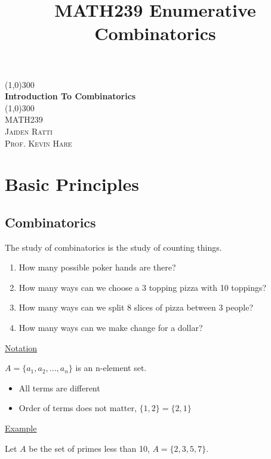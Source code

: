 \documentclass{article}
\title{MATH239 Enumerative Combinatorics}
\begin{document}
\begin{titlepage}
	\begin{center}
    \line(1,0){300}\\
    [0.65cm]
	\huge{\bfseries Introduction To Combinatorics}\\
	\line(1,0){300}\\
	\textsc{\Large MATH239}\\
	\textsc{\Large  Jaiden Ratti}\\
        \textsc{\Large Prof. Kevin Hare}\\
	[5.5cm]
	\end{center}
\end{titlepage}




\tableofcontents

\pagebreak

\section{Basic Principles}

\subsection{Combinatorics}

The study of combinatorics is the study of counting things. 

\begin{enumerate}
    \item How many possible poker hands are there?
    \item How many ways can we choose a 3 topping pizza with 10 toppings?
    \item How many ways can we split 8 slices of pizza between 3 people?
    \item How many ways can we make change for a dollar?
\end{enumerate}

\underline{Notation}

$A = \{a_1, a_2, ..., a_n\}$ is an n-element set. 
\begin{itemize}
    \item All terms are different
    \item Order of terms does not matter, $\{1,2\} = \{2,1\}$
\end{itemize}

\underline{Example}

Let $A$ be the set of primes less than 10, $A = \{2,3,5,7\}$. 
\end{document}

